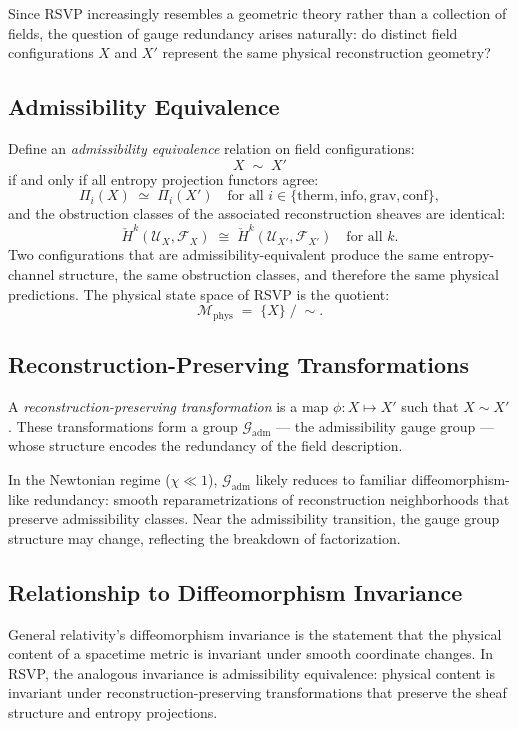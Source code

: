\documentclass[11pt, a4paper]{article}
\theoremstyle{plain}
\theoremstyle{definition}
\theoremstyle{remark}
\newcommand{\sheaf}{\mathcal{F}}
\newcommand{\Ucover}{\mathcal{U}}
\newcommand{\Hcech}{\check{H}}
\begin{document}
Since RSVP increasingly resembles a geometric theory rather than a collection of
fields, the question of gauge redundancy arises naturally: do distinct field
configurations $X$ and $X'$ represent the same physical reconstruction geometry?

\subsection{Admissibility Equivalence}

Define an \emph{admissibility equivalence} relation on field configurations:
\[
  X \;\sim\; X'
\]
if and only if all entropy projection functors agree:
\[
  \Pi_i(X) \;\simeq\; \Pi_i(X') \quad \text{for all } i \in \{\mathrm{therm},
  \mathrm{info}, \mathrm{grav}, \mathrm{conf}\},
\]
and the obstruction classes of the associated reconstruction sheaves are identical:
\[
  \Hcech^k(\Ucover_X, \sheaf_X) \;\cong\; \Hcech^k(\Ucover_{X'}, \sheaf_{X'})
  \quad \text{for all } k.
\]
Two configurations that are admissibility-equivalent produce the same entropy-channel
structure, the same obstruction classes, and therefore the same physical predictions.
The physical state space of RSVP is the quotient:
\[
  \mathcal{M}_{\mathrm{phys}} \;=\; \{X\} \;/\; {\sim}.
\]

\subsection{Reconstruction-Preserving Transformations}

A \emph{reconstruction-preserving transformation} is a map $\phi: X \mapsto X'$
such that $X \sim X'$. These transformations form a group $\mathcal{G}_{\mathrm{adm}}$
--- the admissibility gauge group --- whose structure encodes the redundancy of the
field description.

In the Newtonian regime ($\chi \ll 1$), $\mathcal{G}_{\mathrm{adm}}$ likely reduces
to familiar diffeomorphism-like redundancy: smooth reparametrizations of
reconstruction neighborhoods that preserve admissibility classes. Near the
admissibility transition, the gauge group structure may change, reflecting the
breakdown of factorization.

\subsection{Relationship to Diffeomorphism Invariance}

General relativity's diffeomorphism invariance is the statement that the physical
content of a spacetime metric is invariant under smooth coordinate changes. In RSVP,
the analogous invariance is admissibility equivalence: physical content is invariant
under reconstruction-preserving transformations that preserve the sheaf structure and
entropy projections.
\end{document}
